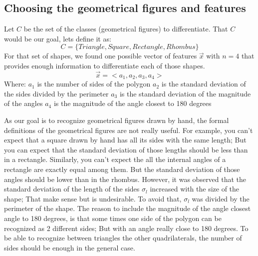 \documentclass{article}
\begin{document}
	\subsection{Choosing the geometrical figures and features}
	Let $C$ be the set of the classes (geometrical figures) to differentiate. That 
	$C$ would be our goal, lets define it as:
	\[C = \{ Triangle, Square, Rectangle, Rhombus \} \]
	For that set of shapes, we found one possible vector of features $\vec{x}$ with
	$n=4$ that provides enough information to differentiate each of those shapes.
	\[\vec{x} = <a_1,a_2,a_3,a_4> \]
	Where:\newline
	$a_1$ is the number of sides of the polygon\newline
	$a_2$ is the standard deviation of the sides divided by the perimeter\newline
	$a_3$ is the standard deviation of the magnitude of the angles\newline
	$a_4$ is the magnitude of the angle closest to 180 degrees\newline
	
	As our goal is to recognize geometrical figures drawn by hand, the formal definitions
	of the geometrical figures are not really useful. For example, you can't expect that 
	a square drawn by hand has all its sides with the same length; But you can expect 
	that the standard deviation of those lengths should be less than in a rectangle.
	Similarly, you can't expect the all the internal angles of a rectangle are
	exactly equal among them. But the standard deviation of those angles should be
	lower than in the rhombus.\newline
	However, it was observed that the standard deviation of the length of the sides
	$\sigma_l$ increased with the size of the shape; That make sense but is
	undesirable. To avoid that, $\sigma_l$ was divided by the perimeter of the shape.
	The reason to include the magnitude of the angle closest angle to 180 degrees, is
	that some times one side of the polygon can be recognized as 2 different sides;
	But with an angle really close to 180 degrees.
	To be able to recognize between triangles the other quadrilaterals, the number of
	sides should be enough in the general case.
	
\end{document}
